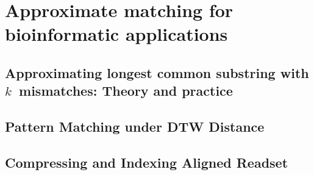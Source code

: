 \part{Approximate matching for bioinformatic applications}

\mainmatter
\chapter{Approximating longest common substring with \texorpdfstring{$k$}{k}~mismatches: Theory and practice}\label{chap:LCS}

\mainmatter
\chapter{Pattern Matching under DTW Distance}\label{chap:DTW}

\mainmatter
\chapter{Compressing and Indexing Aligned Readset}\label{chap:XBWT}
